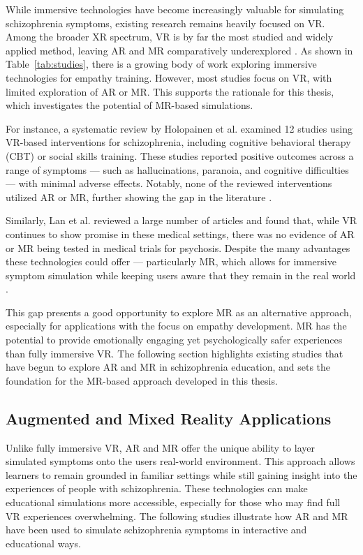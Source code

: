 While immersive technologies have become increasingly valuable for simulating schizophrenia symptoms, existing research remains heavily focused on VR. Among the broader XR spectrum, VR is by far the most studied and widely applied method, leaving AR and MR comparatively underexplored \cite{Kuhail2022}. As shown in Table~\ref{tab:studies}, there is a growing body of work exploring immersive technologies for empathy training. However, most studies focus on VR, with limited exploration of AR or MR. This supports the rationale for this thesis, which investigates the potential of MR-based simulations.

\vspace{1em}

For instance, a systematic review by Holopainen et al. examined 12 studies using VR-based interventions for schizophrenia, including cognitive behavioral therapy (CBT) or social skills training. These studies reported positive outcomes across a range of symptoms — such as hallucinations, paranoia, and cognitive difficulties — with minimal adverse effects. Notably, none of the reviewed interventions utilized AR or MR, further showing the gap in the literature \cite{Holopainen2023}.

\vspace{1em}

Similarly, Lan et al. reviewed a large number of articles and found that, while VR continues to show promise in these medical settings, there was no evidence of AR or MR being tested in medical trials for psychosis. Despite the many advantages these technologies could offer — particularly MR, which allows for immersive symptom simulation while keeping users aware that they remain in the real world \cite{Lan2023}.

This gap presents a good opportunity to explore MR as an alternative approach, especially for applications with the focus on empathy development. MR has the potential to provide emotionally engaging yet psychologically safer experiences than fully immersive VR. The following section highlights existing studies that have begun to explore AR and MR in schizophrenia education, and sets the foundation for the MR-based approach developed in this thesis.

\subsection{Augmented and Mixed Reality Applications}

Unlike fully immersive VR, AR and MR offer the unique ability to layer simulated symptoms onto the users real-world environment. This approach allows learners to remain grounded in familiar settings while still gaining insight into the experiences of people with schizophrenia. These technologies can make educational simulations more accessible, especially for those who may find full VR experiences overwhelming. The following studies illustrate how AR and MR have been used to simulate schizophrenia symptoms in interactive and educational ways.

